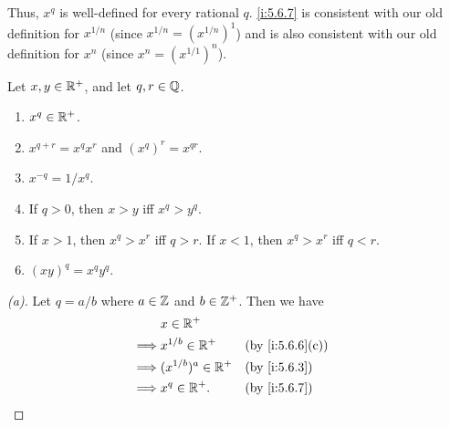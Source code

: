 \begin{note}
  Thus, \(x^q\) is well-defined for every rational \(q\).
  \cref{i:5.6.7} is consistent with our old definition for \(x^{1 / n}\) (since \(x^{1 / n} = (x^{1 / n})^1\)) and is also consistent with our old definition for \(x^n\) (since \(x^n = (x^{1 / 1})^n\)).
\end{note}

\begin{lem}\label{i:5.6.9}
  Let \(x, y \in \mathbb{R}^+\), and let \(q, r \in \mathbb{Q}\).
  \begin{enumerate}
    \item \(x^q \in \mathbb{R}^+\).
    \item \(x^{q + r} = x^q x^r\) and \((x^q)^r = x^{qr}\).
    \item \(x^{-q} = 1 / x^q\).
    \item If \(q > 0\), then \(x > y\) iff \(x^q > y^q\).
    \item If \(x > 1\), then \(x^q > x^r\) iff \(q > r\).
          If \(x < 1\), then \(x^q > x^r\) iff \(q < r\).
    \item \((xy)^q = x^q y^q\).
  \end{enumerate}
\end{lem}

\begin{proof}[(a)]
  Let \(q = a / b\) where \(a \in \mathbb{Z}\) and \(b \in \mathbb{Z}^+\).
  Then we have
  \begin{align*}
             & x \in \R^+                                  \\
    \implies & x^{1 / b} \in \R^+     &  & \by{i:5.6.6}[c] \\
    \implies & (x^{1 / b})^a \in \R^+ &  & \by{i:5.6.3}    \\
    \implies & x^q \in \R^+.          &  & \by{i:5.6.7}
  \end{align*}
\end{proof}

